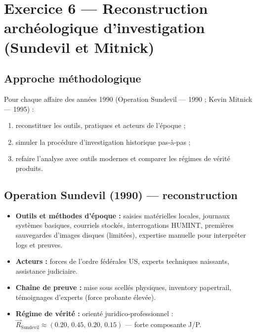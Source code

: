 \documentclass[memoire, 12pt]{report}
\begin{document}
\bigskip

\section{Exercice 6 — Reconstruction archéologique d'investigation (Sundevil et Mitnick)}

\subsection*{Approche méthodologique}
Pour chaque affaire des années 1990 (Operation Sundevil — 1990 ; Kevin Mitnick — 1995) :
\begin{enumerate}
  \item reconstituer les outils, pratiques et acteurs de l'époque ;
  \item simuler la procédure d'investigation historique pas-à-pas ;
  \item refaire l'analyse avec outils modernes et comparer les régimes de vérité produits.
\end{enumerate}

\subsection*{Operation Sundevil (1990) — reconstruction}
\begin{itemize}
  \item \textbf{Outils et méthodes d'époque :} saisies matérielles locales, journaux systèmes basiques, courriels stockés, interrogations HUMINT, premières sauvegardes d'images disques (limitées), expertise manuelle pour interpréter logs et preuves.
  \item \textbf{Acteurs :} forces de l'ordre fédérales US, experts techniques naissants, assistance judiciaire.
  \item \textbf{Chaîne de preuve :} mise sous scellés physiques, inventory papertrail, témoignages d'experts (force probante élevée).
  \item \textbf{Régime de vérité :} orienté juridico-professionnel : $\vec{R}_{\text{Sundevil}} \approx (0.20,\,0.45,\,0.20,\,0.15)$ — forte composante J/P.
\end{itemize}
\end{document}
